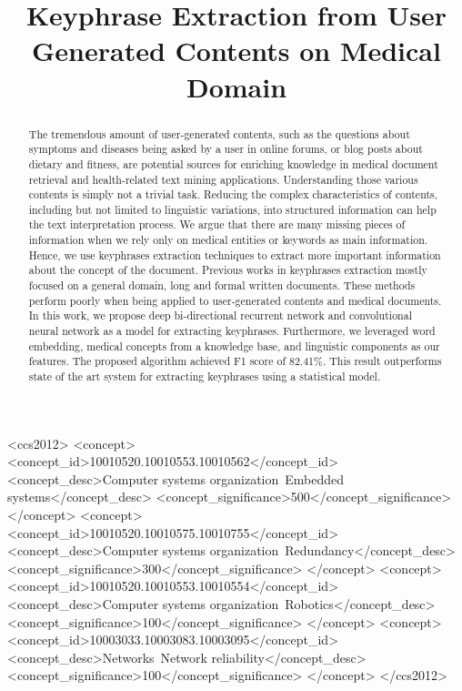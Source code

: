 \documentclass[sigconf]{acmart}
\begin{document}
\title{Keyphrase Extraction from User Generated Contents on Medical Domain}
\iffalse
\titlenote{Produces the permission block, and
  copyright information}
\subtitle{Extended Abstract}
\subtitlenote{The full version of the author's guide is available as
  \texttt{acmart.pdf} document}
\fi



\begin{abstract}
The tremendous amount of user-generated contents, such as the questions about symptoms and diseases being asked by a user in online forums, or blog posts about dietary and fitness, are potential sources for enriching knowledge in medical document retrieval and health-related text mining applications. Understanding those various contents is simply not a trivial task. Reducing the complex characteristics of contents, including but not limited to linguistic variations, into structured information can help the text interpretation process. We argue that there are many missing pieces of information when we rely only on medical entities or keywords as main information. Hence, we use keyphrases extraction techniques to extract more important information about the concept of the document. Previous works in keyphrases extraction mostly focused on a general domain, long and formal written documents. These methods perform poorly when being applied to user-generated contents and medical documents. In this work, we propose deep bi-directional recurrent network and convolutional neural network as a model for extracting keyphrases. Furthermore, we leveraged word embedding, medical concepts from a knowledge base, and linguistic components as our features. The proposed algorithm achieved F1 score of 82.41\%. This result outperforms state of the art system for extracting keyphrases using a statistical model.
\end{abstract}

%
%
\begin{CCSXML}
<ccs2012>
 <concept>
  <concept_id>10010520.10010553.10010562</concept_id>
  <concept_desc>Computer systems organization~Embedded systems</concept_desc>
  <concept_significance>500</concept_significance>
 </concept>
 <concept>
  <concept_id>10010520.10010575.10010755</concept_id>
  <concept_desc>Computer systems organization~Redundancy</concept_desc>
  <concept_significance>300</concept_significance>
 </concept>
 <concept>
  <concept_id>10010520.10010553.10010554</concept_id>
  <concept_desc>Computer systems organization~Robotics</concept_desc>
  <concept_significance>100</concept_significance>
 </concept>
 <concept>
  <concept_id>10003033.10003083.10003095</concept_id>
  <concept_desc>Networks~Network reliability</concept_desc>
  <concept_significance>100</concept_significance>
 </concept>
</ccs2012>  
\end{CCSXML}
\iffalse
\ccsdesc[500]{Computer systems organization~Embedded systems}
\ccsdesc[300]{Computer systems organization~Redundancy}
\ccsdesc{Computer systems organization~Robotics}
\ccsdesc[100]{Networks~Network reliability}
\fi
\end{document}
